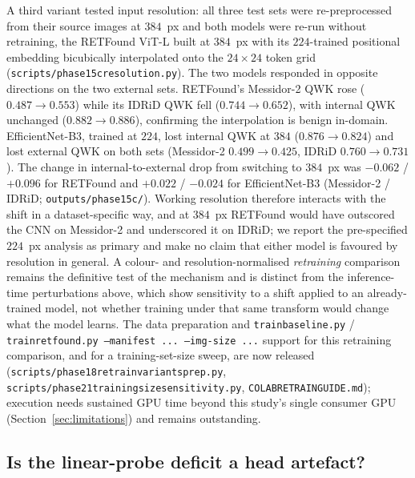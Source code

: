 \documentclass[journal]{IEEEtran}
\renewcommand{\_}{\origunderscore\allowbreak}
\begin{document}
A third variant tested input resolution: all three test sets were
re-preprocessed from their source images at $384$~px and both models were re-run
without retraining, the RETFound ViT-L built at $384$~px with its $224$-trained
positional embedding bicubically interpolated onto the $24{\times}24$ token grid
(\texttt{scripts/\allowbreak{}phase15c\_resolution.py}). The two models responded in
opposite directions on the two external sets. RETFound's Messidor-2 QWK rose
($0.487\to0.553$) while its IDRiD QWK fell ($0.744\to0.652$), with internal QWK
unchanged ($0.882\to0.886$), confirming the interpolation is benign in-domain.
EfficientNet-B3, trained at $224$, lost internal QWK at $384$
($0.876\to0.824$) and lost external QWK on both sets (Messidor-2
$0.499\to0.425$, IDRiD $0.760\to0.731$). The change in internal-to-external drop
from switching to $384$~px was $-0.062$ / $+0.096$ for RETFound and $+0.022$ /
$-0.024$ for EfficientNet-B3 (Messidor-2 / IDRiD;
\texttt{outputs/\allowbreak{}phase15c/\allowbreak{}}). Working resolution therefore
interacts with the shift in a dataset-specific way, and at $384$~px RETFound would
have outscored the CNN on Messidor-2 and underscored it on IDRiD; we report the
pre-specified $224$~px analysis as primary and make no claim that either model is
favoured by resolution in general. A colour- and
resolution-normalised \emph{retraining} comparison remains the definitive test
of the mechanism and is distinct from the inference-time perturbations above,
which show sensitivity to a shift applied to an already-trained model, not
whether training under that same transform would change what the model learns.
The data preparation and \texttt{train\_baseline.py} /
\texttt{train\_retfound.py --manifest ... --img-size ...} support for this
retraining comparison, and for a training-set-size sweep, are now released
(\texttt{scripts/\allowbreak{}phase18\_retrain\_variants\_prep.py},
\texttt{scripts/\allowbreak{}phase21\_training\_size\_sensitivity.py},
\texttt{COLAB\_RETRAIN\_GUIDE.md}); execution needs sustained GPU time beyond
this study's single consumer GPU (Section~\ref{sec:limitations}) and remains
outstanding.


\subsection{Is the linear-probe deficit a head artefact?}
\label{sec:results-headsummary}
\end{document}

